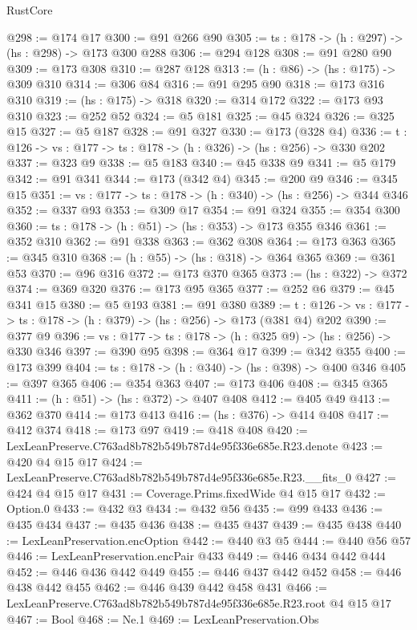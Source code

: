 \begin{lexlean}{RustCore}
\begin{coremodule}
@298 := @174 @17
@300 := @91 @266 @90
@305 := {ts : @178} -> (h : @297) -> (hs : @298) -> @173 @300 @288
@306 := @294 @128
@308 := @91 @280 @90
@309 := @173 @308
@310 := @287 @128
@313 := (h : @86) -> (hs : @175) -> @309 @310
@314 := @306 @84
@316 := @91 @295 @90
@318 := @173 @316 @310
@319 := (hs : @175) -> @318
@320 := @314 @172
@322 := @173 @93 @310
@323 := @252 @52
@324 := @5 @181
@325 := @45 @324
@326 := @325 @15
@327 := @5 @187
@328 := @91 @327
@330 := @173 (@328 @4)
@336 := {t : @126} -> {vs : @177} -> {ts : @178} -> (h : @326) -> (hs : @256) -> @330 @202
@337 := @323 @9
@338 := @5 @183
@340 := @45 @338 @9
@341 := @5 @179
@342 := @91 @341
@344 := @173 (@342 @4)
@345 := @200 @9
@346 := @345 @15
@351 := {vs : @177} -> {ts : @178} -> (h : @340) -> (hs : @256) -> @344 @346
@352 := @337 @93
@353 := @309 @17
@354 := @91 @324
@355 := @354 @300
@360 := {ts : @178} -> (h : @51) -> (hs : @353) -> @173 @355 @346
@361 := @352 @310
@362 := @91 @338
@363 := @362 @308
@364 := @173 @363
@365 := @345 @310
@368 := (h : @55) -> (hs : @318) -> @364 @365
@369 := @361 @53
@370 := @96 @316
@372 := @173 @370 @365
@373 := (hs : @322) -> @372
@374 := @369 @320
@376 := @173 @95 @365
@377 := @252 @6
@379 := @45 @341 @15
@380 := @5 @193
@381 := @91 @380
@389 := {t : @126} -> {vs : @177} -> {ts : @178} -> (h : @379) -> (hs : @256) -> @173 (@381 @4) @202
@390 := @377 @9
@396 := {vs : @177} -> {ts : @178} -> (h : @325 @9) -> (hs : @256) -> @330 @346
@397 := @390 @95
@398 := @364 @17
@399 := @342 @355
@400 := @173 @399
@404 := {ts : @178} -> (h : @340) -> (hs : @398) -> @400 @346
@405 := @397 @365
@406 := @354 @363
@407 := @173 @406
@408 := @345 @365
@411 := (h : @51) -> (hs : @372) -> @407 @408
@412 := @405 @49
@413 := @362 @370
@414 := @173 @413
@416 := (hs : @376) -> @414 @408
@417 := @412 @374
@418 := @173 @97
@419 := @418 @408
@420 := LexLeanPreserve.C763ad8b782b549b787d4e95f336e685e.R23.denote
@423 := @420 @4 @15 @17
@424 := LexLeanPreserve.C763ad8b782b549b787d4e95f336e685e.R23.__fits_0
@427 := @424 @4 @15 @17
@431 := Coverage.Prims.fixedWide @4 @15 @17
@432 := Option.{0}
@433 := @432 @3
@434 := @432 @56
@435 := @99 @433
@436 := @435 @434
@437 := @435 @436
@438 := @435 @437
@439 := @435 @438
@440 := LexLeanPreservation.encOption
@442 := @440 @3 @5
@444 := @440 @56 @57
@446 := LexLeanPreservation.encPair @433
@449 := @446 @434 @442 @444
@452 := @446 @436 @442 @449
@455 := @446 @437 @442 @452
@458 := @446 @438 @442 @455
@462 := @446 @439 @442 @458 @431
@466 := LexLeanPreserve.C763ad8b782b549b787d4e95f336e685e.R23.root @4 @15 @17
@467 := Bool
@468 := Ne.{1}
@469 := LexLeanPreservation.Obs

\end{coremodule}
\end{lexlean}
